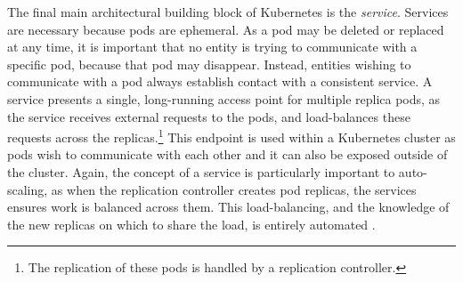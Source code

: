 The final main architectural building block of Kubernetes is the \textit{service}.
Services are necessary because pods are ephemeral. As a pod may be deleted or
replaced at any time, it is important that no entity is trying to communicate
with a specific pod, because that pod may disappear. Instead, entities wishing to
communicate with a pod always establish contact with a consistent service.
A service presents a single, long-running access point
for multiple replica pods, as the service receives
external requests to the pods, and load-balances
these requests across the replicas.\footnote{The replication of
these pods is handled by a replication controller.} This endpoint is used within
a Kubernetes cluster as pods wish to communicate with each other and it can also
be exposed outside of the cluster. Again, the concept of a service is
particularly important to auto-scaling, as when the replication
controller creates pod replicas, the services ensures work is balanced across
them. This load-balancing, and the knowledge of the new replicas on which to
share the load, is entirely automated \cite{k8s-services}.
